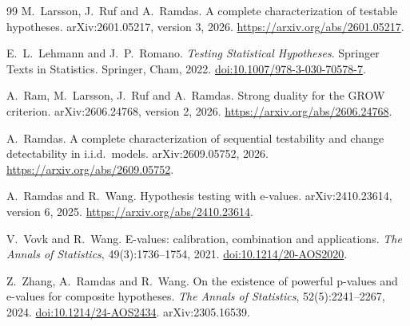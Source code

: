 \documentclass[11pt,a4paper]{article}
\theoremstyle{definition}
\theoremstyle{remark}
\begin{document}
\begin{thebibliography}{99}
M.~Larsson, J.~Ruf and A.~Ramdas.
\newblock A complete characterization of testable hypotheses.
\newblock arXiv:2601.05217, version 3, 2026.
\newblock \url{https://arxiv.org/abs/2601.05217}.

E.~L.~Lehmann and J.~P.~Romano.
\newblock \emph{Testing Statistical Hypotheses}.
\newblock Springer Texts in Statistics. Springer, Cham, 2022.
\newblock \href{https://doi.org/10.1007/978-3-030-70578-7}{doi:10.1007/978-3-030-70578-7}.

A.~Ram, M.~Larsson, J.~Ruf and A.~Ramdas.
\newblock Strong duality for the GROW criterion.
\newblock arXiv:2606.24768, version 2, 2026.
\newblock \url{https://arxiv.org/abs/2606.24768}.

A.~Ramdas.
\newblock A complete characterization of sequential testability and change detectability in i.i.d.\ models.
\newblock arXiv:2609.05752, 2026.
\newblock \url{https://arxiv.org/abs/2609.05752}.

A.~Ramdas and R.~Wang.
\newblock Hypothesis testing with e-values.
\newblock arXiv:2410.23614, version 6, 2025.
\newblock \url{https://arxiv.org/abs/2410.23614}.

V.~Vovk and R.~Wang.
\newblock E-values: calibration, combination and applications.
\newblock \emph{The Annals of Statistics}, 49(3):1736--1754, 2021.
\newblock \href{https://doi.org/10.1214/20-AOS2020}{doi:10.1214/20-AOS2020}.

Z.~Zhang, A.~Ramdas and R.~Wang.
\newblock On the existence of powerful p-values and e-values for composite hypotheses.
\newblock \emph{The Annals of Statistics}, 52(5):2241--2267, 2024.
\newblock \href{https://doi.org/10.1214/24-AOS2434}{doi:10.1214/24-AOS2434}.
\newblock arXiv:2305.16539.

\end{thebibliography}
\end{document}
